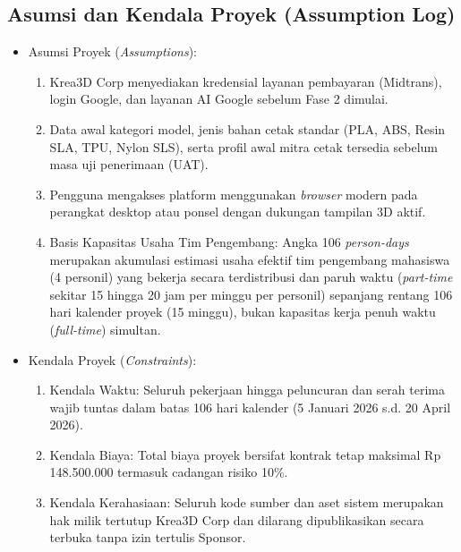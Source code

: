 \documentclass[11pt,a4paper]{article}
\begin{document}
\subsection{Asumsi dan Kendala Proyek (Assumption Log)}
\begin{itemize}[leftmargin=1.5em, itemsep=2pt]
    \item Asumsi Proyek (\textit{Assumptions}):
    \begin{enumerate}[leftmargin=1.5em, itemsep=1pt]
        \item Krea3D Corp menyediakan kredensial layanan pembayaran (Midtrans), login Google, dan layanan AI Google sebelum Fase 2 dimulai.
        \item Data awal kategori model, jenis bahan cetak standar (PLA, ABS, Resin SLA, TPU, Nylon SLS), serta profil awal mitra cetak tersedia sebelum masa uji penerimaan (UAT).
        \item Pengguna mengakses platform menggunakan \textit{browser} modern pada perangkat desktop atau ponsel dengan dukungan tampilan 3D aktif.
        \item Basis Kapasitas Usaha Tim Pengembang: Angka 106 \textit{person-days} merupakan akumulasi estimasi usaha efektif tim pengembang mahasiswa (4 personil) yang bekerja secara terdistribusi dan paruh waktu (\textit{part-time} sekitar 15 hingga 20 jam per minggu per personil) sepanjang rentang 106 hari kalender proyek (15 minggu), bukan kapasitas kerja penuh waktu (\textit{full-time}) simultan.
    \end{enumerate}
    \item Kendala Proyek (\textit{Constraints}):
    \begin{enumerate}[leftmargin=1.5em, itemsep=1pt]
        \item Kendala Waktu: Seluruh pekerjaan hingga peluncuran dan serah terima wajib tuntas dalam batas 106 hari kalender (5 Januari 2026 s.d. 20 April 2026).
        \item Kendala Biaya: Total biaya proyek bersifat kontrak tetap maksimal Rp 148.500.000 termasuk cadangan risiko 10\%.
        \item Kendala Kerahasiaan: Seluruh kode sumber dan aset sistem merupakan hak milik tertutup Krea3D Corp dan dilarang dipublikasikan secara terbuka tanpa izin tertulis Sponsor.
    \end{enumerate}
\end{itemize}

\end{document}
